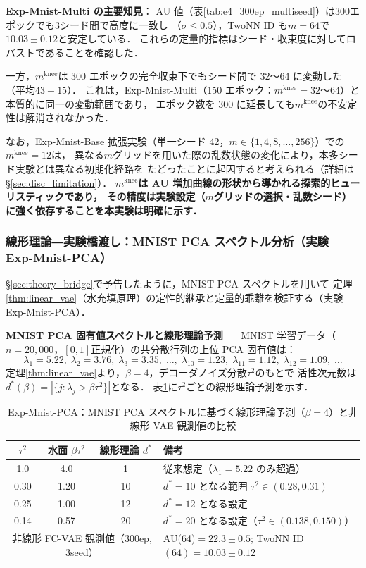 \documentclass[11pt,a4paper]{jsarticle}
\newcommand{\mknee}{m^{\mathrm{knee}}}
\begin{document}
\textbf{Exp-Mnist-Multi の主要知見}：
AU 値（表\ref{tab:e4_300ep_multiseed}）は300エポックでも3シード間で高度に一致し
（$\sigma \leq 0.5$），TwoNN ID も$m = 64$で$10.03 \pm 0.12$と安定している．
これらの定量的指標はシード・収束度に対してロバストであることを確認した．

一方，$\mknee$は 300 エポックの完全収束下でもシード間で 32〜64 に変動した
（平均$43 \pm 15$）．
これは，Exp-Mnist-Multi（150 エポック：$\mknee = 32$〜$64$）と本質的に同一の変動範囲であり，
エポック数を 300 に延長しても$\mknee$の不安定性は解消されなかった．

なお，Exp-Mnist-Base 拡張実験（単一シード 42，$m \in \{1, 4, 8, \ldots, 256\}$）での$\mknee = 12$は，
異なる$m$グリッドを用いた際の乱数状態の変化により，本多シード実験とは異なる初期化経路を
たどったことに起因すると考えられる（詳細は§\ref{sec:disc_limitation}）．
\textbf{$\mknee$は AU 増加曲線の形状から導かれる探索的ヒューリスティックであり，
その精度は実験設定（$m$グリッドの選択・乱数シード）に強く依存することを本実験は明確に示す．}

\subsubsection{線形理論―実験橋渡し：MNIST PCA スペクトル分析（実験 Exp-Mnist-PCA）}\label{sec:exp_em}

§\ref{sec:theory_bridge}で予告したように，MNIST PCA スペクトルを用いて
定理\ref{thm:linear_vae}（水充填原理）の定性的継承と定量的乖離を検証する（実験 Exp-Mnist-PCA）．

\textbf{MNIST PCA 固有値スペクトルと線形理論予測}~~~
MNIST 学習データ（$n = 20{,}000$，$[0,1]$正規化）の共分散行列の上位 PCA 固有値は：
\[
\lambda_1=5.22,\; \lambda_2=3.76,\; \lambda_3=3.35,\;\ldots,\;
\lambda_{10}=1.23,\; \lambda_{11}=1.12,\; \lambda_{12}=1.09,\;\ldots
\]
定理\ref{thm:linear_vae}より，$\beta=4$，デコーダノイズ分散$\tau^2$のもとで
活性次元数は$d^*(\beta) = |\{j : \lambda_j > \beta\tau^2\}|$となる．
表\ref{tab:theory_pred}に$\tau^2$ごとの線形理論予測を示す．

\begin{table}[H]
\centering
\caption{Exp-Mnist-PCA：MNIST PCA スペクトルに基づく線形理論予測（$\beta=4$）と非線形 VAE 観測値の比較}
\label{tab:theory_pred}
\small
\begin{tabular}{ccc|l}
\toprule
$\tau^2$ & 水面 $\beta\tau^2$ & 線形理論 $d^*$ & 備考 \\
\midrule
1.0  & 4.0  & 1   & 従来想定（$\lambda_1=5.22$ のみ超過）\\
0.30 & 1.20 & 10  & $d^* = 10$ となる範囲 $\tau^2 \in (0.28, 0.31)$ \\
0.25 & 1.00 & 12  & $d^* = 12$ となる設定 \\
0.14 & 0.57 & 20  & $d^* = 20$ となる設定（$\tau^2 \in (0.138, 0.150)$） \\
\midrule
\multicolumn{3}{c|}{非線形 FC-VAE 観測値（300ep, 3seed）} & AU(64)$=22.3\pm0.5$; TwoNN ID$(64)=10.03\pm0.12$ \\
\bottomrule
\end{tabular}
\end{table}
\end{document}
